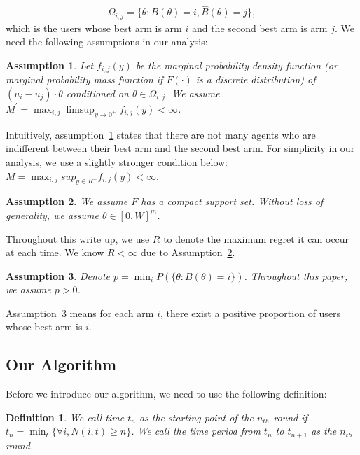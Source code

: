 \documentclass{article}
\newtheorem{definition}{Definition}[section]
\newtheorem{assumption}{Assumption}
\begin{document}
\begin{align}
\Omega_{i,j}=\{\theta:B(\theta)=i, \hat{B}(\theta)=j\}, \nonumber 
\end{align}
which is the users whose best arm is arm $i$ and the second best arm is arm $j$. We need the following assumptions in our analysis:

\begin{assumption} Let $f_{i,j}(y)$ be the marginal probability density function (or marginal probability mass function if $F(\cdot)$ is a discrete distribution) of $(u_i-u_j)\cdot\theta$ conditioned on $\theta \in \Omega_{i,j}$. We assume $M^{'}=\max_{i,j}\limsup_{y\rightarrow 0^{+}}f_{i,j}(y) <\infty$.
\label{A1}
\end{assumption}

Intuitively, assumption~\ref{A1} states that there are not many agents who are indifferent between their best arm and the second best arm. For simplicity in our analysis, we use a slightly stronger condition below: $M=\max_{i,j}sup_{y\in R^{+}}f_{i,j}(y) <\infty$.


\begin{assumption} We assume $F$ has a compact support set. Without loss of generality, we assume $\theta\in [0,W]^m$.
\label{A2}
\end{assumption}

Throughout this write up, we use $R$ to denote the maximum regret it can occur at each time. We know $R<\infty$ due to Assumption~\ref{A2}. 

\begin{assumption}
Denote $p=\min_{i}P(\{\theta: B(\theta)=i\})$. Throughout this paper, we assume $p>0$.
\label{A3}
\end{assumption}

Assumption~\ref{A3} means for each arm $i$, there exist a positive proportion of users whose best arm is $i$. 

\subsection{Our Algorithm}
Before we introduce our algorithm, we need to use the following definition:

\begin{definition}
We call time $t_{n}$ as the starting point of the $n_{th}$ round if $t_{n}=\min_{t}\{\forall i, N(i,t)\geq n\}$. We call the time period from $t_{n}$ to $t_{n+1}$ as the $n_{th}$ round.
\end{definition}
\end{document}
